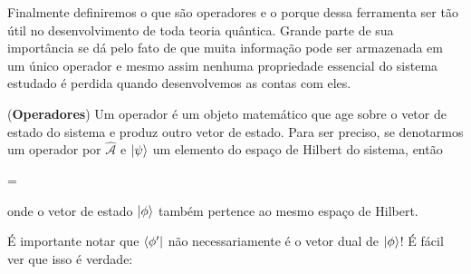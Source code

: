     Finalmente definiremos o que são operadores e o porque dessa ferramenta ser tão útil no desenvolvimento de toda teoria quântica. Grande parte de sua importância se dá pelo fato de que muita informação pode ser armazenada em um único operador e mesmo assim nenhuma propriedade essencial do sistema estudado é perdida quando desenvolvemos as contas com eles.
    
    \begin{definition}\label{def: operators}
        
        (\textbf{Operadores}) Um operador é um objeto matemático que age sobre o vetor de estado do sistema e produz outro vetor de estado. Para ser preciso, se denotarmos um operador por $\hat{\mathcal{A}}$ e $\ket{\psi}$ um elemento do espaço de Hilbert do sistema, então
            \begin{answer*}
                \ket{\psi} = \ket{\phi}
            \end{answer*}
        onde o vetor de estado $\ket{\phi}$ também pertence ao mesmo espaço de Hilbert.
    \end{definition}
    
    É importante notar que $\bra{\phi'}$ não necessariamente é o vetor dual de $\ket{\phi}$! É fácil ver que isso é verdade:
    
